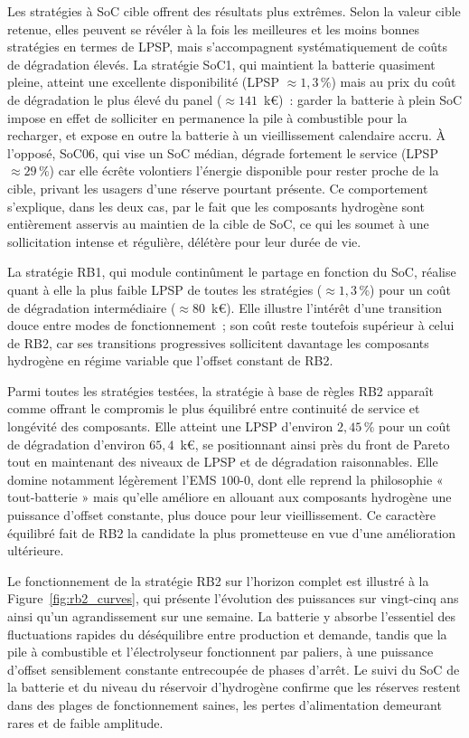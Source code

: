 Les stratégies à SoC cible offrent des résultats plus extrêmes. Selon la valeur cible retenue, elles peuvent se révéler à la fois les meilleures et les moins bonnes stratégies en termes de LPSP, mais s'accompagnent systématiquement de coûts de dégradation élevés. La stratégie SoC1, qui maintient la batterie quasiment pleine, atteint une excellente disponibilité (LPSP $\approx 1{,}3\,\%$) mais au prix du coût de dégradation le plus élevé du panel ($\approx 141$~k€)~: garder la batterie à plein SoC impose en effet de solliciter en permanence la pile à combustible pour la recharger, et expose en outre la batterie à un vieillissement calendaire accru. À l'opposé, SoC06, qui vise un SoC médian, dégrade fortement le service (LPSP $\approx 29\,\%$) car elle écrête volontiers l'énergie disponible pour rester proche de la cible, privant les usagers d'une réserve pourtant présente. Ce comportement s'explique, dans les deux cas, par le fait que les composants hydrogène sont entièrement asservis au maintien de la cible de SoC, ce qui les soumet à une sollicitation intense et régulière, délétère pour leur durée de vie.

La stratégie RB1, qui module continûment le partage en fonction du SoC, réalise quant à elle la plus faible LPSP de toutes les stratégies ($\approx 1{,}3\,\%$) pour un coût de dégradation intermédiaire ($\approx 80$~k€). Elle illustre l'intérêt d'une transition douce entre modes de fonctionnement~; son coût reste toutefois supérieur à celui de RB2, car ses transitions progressives sollicitent davantage les composants hydrogène en régime variable que l'offset constant de RB2.

Parmi toutes les stratégies testées, la stratégie à base de règles RB2 apparaît comme offrant le compromis le plus équilibré entre continuité de service et longévité des composants. Elle atteint une LPSP d'environ $2{,}45\,\%$ pour un coût de dégradation d'environ $65{,}4$~k€, se positionnant ainsi près du front de Pareto tout en maintenant des niveaux de LPSP et de dégradation raisonnables. Elle domine notamment légèrement l'EMS $100$-$0$, dont elle reprend la philosophie « tout-batterie » mais qu'elle améliore en allouant aux composants hydrogène une puissance d'offset constante, plus douce pour leur vieillissement. Ce caractère équilibré fait de RB2 la candidate la plus prometteuse en vue d'une amélioration ultérieure.

Le fonctionnement de la stratégie RB2 sur l'horizon complet est illustré à la Figure~\ref{fig:rb2_curves}, qui présente l'évolution des puissances sur vingt-cinq ans ainsi qu'un agrandissement sur une semaine. La batterie y absorbe l'essentiel des fluctuations rapides du déséquilibre entre production et demande, tandis que la pile à combustible et l'électrolyseur fonctionnent par paliers, à une puissance d'offset sensiblement constante entrecoupée de phases d'arrêt. Le suivi du SoC de la batterie et du niveau du réservoir d'hydrogène confirme que les réserves restent dans des plages de fonctionnement saines, les pertes d'alimentation demeurant rares et de faible amplitude.

